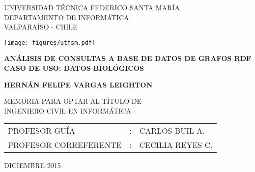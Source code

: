 
\begin{center}
\begin{spacing}{1}
{\large UNIVERSIDAD TÉCNICA FEDERICO SANTA MARÍA}\\
DEPARTAMENTO DE INFORMÁTICA\\
VALPARAÍSO - CHILE
\end{spacing}

\vspace{12mm}


\texttt{[image: figures/utfsm.pdf]}


\vspace{15mm}
\begin{spacing}{1.5} 
\textbf{\large ANÁLISIS DE CONSULTAS A BASE DE DATOS DE GRAFOS RDF}\\
\textbf{\large CASO DE USO: DATOS BIOLÓGICOS}\\
\end{spacing}

\vspace{20mm}
\textbf{\large HERNÁN FELIPE VARGAS LEIGHTON}

\vspace{12mm}
\begin{spacing}{1.25} 
MEMORIA PARA OPTAR AL TÍTULO DE\\
INGENIERO CIVIL EN INFORMÁTICA
\end{spacing}

\vspace{15mm}
\begin{table}[h]
  \begin{center}
  \begin{tabular}{ l c l }
  PROFESOR GUÍA & : & CARLOS BUIL A.\\
  PROFESOR CORREFERENTE & : & CECILIA REYES C.\\
  \end{tabular}
  \end{center}
\end{table}
\vfill
\large DICIEMBRE 2015
\end{center}

